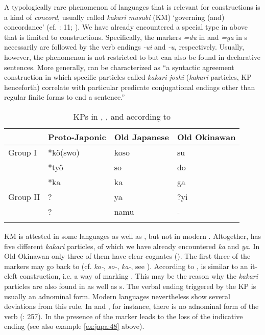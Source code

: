 A typologically rare phenomenon of  languages that is relevant for  constructions is a kind of \textit{ concord}, usually called \textit{kakari musubi} (KM) ‘governing (and) concordance’ (cf. \citealt{Shimoji2010}: 11; \citealt{Shinzato2013}). We have already encountered a special type in  above that is limited to  constructions. Specifically, the  markers \textit{=du} in   and \textit{=ga} in s necessarily are followed by the verb endings \textit{-ui} and \textit{-u}, respectively. Usually, however, the phenomenon is not restricted to  but can also be found in declarative sentences. More generally, \textit{} can be characterized as “a syntactic agreement construction in which specific particles called \textit{kakari joshi} (\textit{kakari} particles, KP henceforth) correlate with particular predicate conjugational endings other than regular finite forms to end a sentence.” \citep[299]{Shinzato2015}

\begin{table}[p]
\caption{KPs in , , and  according to \cite[306ff.]{Shinzato2015}}
\label{tab:japa:4}
\small
\begin{tabularx}{\textwidth}{XXXl}
\lsptoprule
& \textbf{Proto-Japonic} & \textbf{Old Japanese} & \textbf{Old Okinawan}\\
\midrule
Group I & *kö(swo) & koso & su\\
& *työ & so & do\\
& *ka & ka & ga\\
Group II & ? & ya & ?yi\\
& ? & namu & -\\
\lspbottomrule
\end{tabularx}
\end{table}

KM is attested in some  languages as well as , but not in modern . Altogether,  has five different \textit{kakari} particles, of which we have already encountered \textit{ka} and \textit{ya}. In Old Okinawan only three of them have clear cognates (). The first three of the markers may go back to  (cf.   \textit{ko-}, \textit{so-}, \textit{ka-}, see ). According to \citet{Shinzato2015}, \textit{} is similar to an it-cleft construction, i.e. a way of marking . This may be the reason why the \textit{kakari} particles are also found in  as well as s. The verbal ending triggered by the KP is usually an adnominal form. Modern  languages nevertheless show several deviations from this rule. In  and , for instance, there is no adnominal form of the verb (\citealt{Davis2015}: 257). In  the presence of the  marker leads to the loss of the indicative ending (see also example \ref{ex:japa:48} above).

